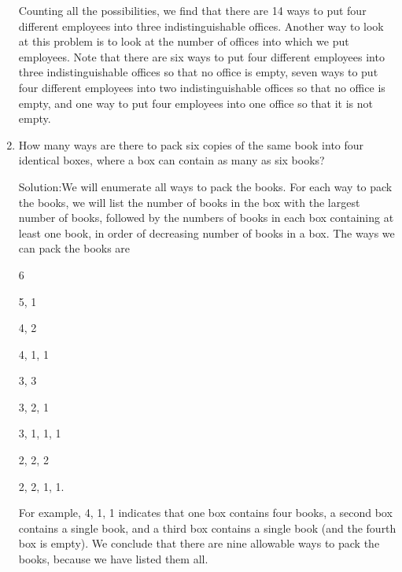 \documentclass[11pt,a4paper]{book}
\begin{document}
\begin{enumerate}[label=Example~\arabic*]
Counting all the possibilities, we find that there are 14 ways to put four different employees into three indistinguishable offices.
Another way to look at this problem is to look at the number of offices into which we put employees.
Note that there are six ways to put four different employees into three indistinguishable offices so that no office is empty, seven ways to put four different employees into two indistinguishable offices so that no office is empty, and one way to put four employees into one office so that it is not empty.

\item How many ways are there to pack six copies of the same book into four identical boxes, where a box can contain as many as six books?

Solution:We will enumerate all ways to pack the books.
For each way to pack the books, we will list the number of books in the box with the largest number of books, followed by the numbers of books in each box containing at least one book, in order of decreasing number of books in a box.
The ways we can pack the books are

6

5, 1

4, 2

4, 1, 1

3, 3

3, 2, 1

3, 1, 1, 1

2, 2, 2

2, 2, 1, 1.

For example, 4, 1, 1 indicates that one box contains four books, a second box contains a single book, and a third box contains a single book (and the fourth box is empty).
We conclude that there are nine allowable ways to pack the books, because we have listed them all.
\end{enumerate}
\end{document}
